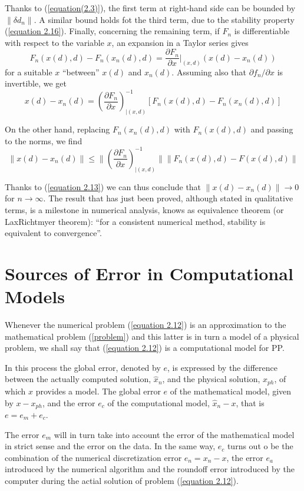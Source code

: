 Thanks to (\ref{equation(2.3)}), the first term at right-hand side can be bounded by $ \| \delta d_n \|$. A similar bound holds fot the third term, due to the stability property (\ref{equation 2.16}). Finally, concerning the remaining term, if $F_n$ is differentiable with respect to the variable $x$, an expansion in a Taylor series gives
\[F_n(x(d), d) - F_n(x_n(d), d) = \frac{\partial F_n}{\partial x}|_{(x, d)}(x(d) - x_n(d))  \]
for a suitable $x$ ``between'' $x(d)$ and $x_n(d)$. Assuming also that $\partial f_n / \partial x$ is invertible, we get
\begin{equation}
    x(d) - x_n(d) = (\frac{\partial F_n}{\partial x})^{-1}_{|(x, d)} [F_n(x(d), d) - F_n(x_n(d), d)]
    \label{equation 2.25}
\end{equation}

On the other hand, replacing $F_n(x_n(d), d)$ with $F_n(x(d), d)$ and passing to the norms, we find
\[ \| x(d) - x_n(d) \| \leq \| (\frac{\partial F_n}{\partial x})^{-1}_{|(x,d)} \| \| F_n(x(d),d) - F(x(d), d)\| \]

Thanks to (\ref{equation 2.13}) we can thus conclude that $\|x(d) - x_n(d)\| \rightarrow 0$ for $n \rightarrow \infty$. The result that has just been proved, although stated in qualitative terms, is a milestone in numerical analysis, knows as equivalence theorem (or LaxRichtmyer theorem): ``for a consistent numerical method, stability is equivalent to convergence''.

\section{Sources of Error in Computational Models}

Whenever the numerical problem (\ref{equation 2.12}) is an approximation to the mathematical problem (\ref{problem}) and this latter is in turn a model of a physical problem, we shall say that (\ref{equation 2.12}) is a computational model for PP.

In this process the global error, denoted by $e$, is expressed by the difference between the actually computed solution, $\hat{x}_n$, and the physical solution, $x_{ph}$, of which $x$ provides a model. The global error $e$ of the mathematical model, given by $x - x_{ph}$, and the error $e_c$ of the computational model, $\hat{x}_n - x$, that is $e = e_m + e_c$.

The error $e_m$ will in turn take into account the error of the mathematical model in strict sense and the error on the data. In the same way, $e_c$ turns out o be the combination of the numerical discretization error $e_n = x_n - x$, the error $e_a$ introduced by the numerical algorithm and the roundoff error introduced by the computer during the actial solution of problem (\ref{equation 2.12}).

